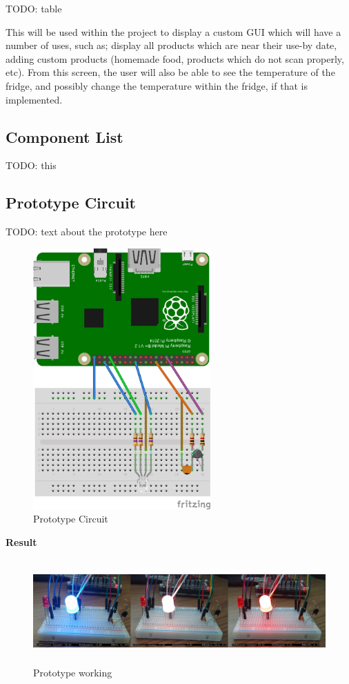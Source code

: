 \documentclass[10pt]{article}
\begin{document}
TODO: table

This will be used within the project to display a custom GUI which will have a number of uses, such as; display all products which are near their use-by date, adding custom products (homemade food, products which do not scan properly, etc). From this screen, the user will also be able to see the temperature of the fridge, and possibly change the temperature within the fridge, if that is implemented.

\subsection{Component List}
TODO: this

\newpage
\subsection{Prototype Circuit}
TODO: text about the prototype here

\begin{figure}[h]
\centering
\caption{Prototype Circuit}
\label{Prototype Circuit}
\includegraphics[height=10cm]{images/prototypeDiagram.png}
\end{figure}

\textbf{Result}
\begin{figure}[h]
\centering
\caption{Prototype working}
\label{Prototype working}
\includegraphics[height=4cm]{images/tempsenproto.png}
\end{figure}
\end{document}
